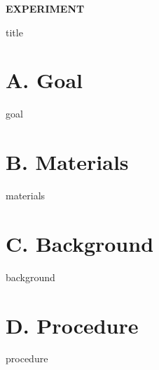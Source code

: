 \documentclass[cover.tex]{subfiles}
\begin{document}
 


\hfill\vspace{0.2cm}\begin{center}{\large \bfseries EXPERIMENT \thechapter\par\Huge
 {title}
 \\[5pt] \par}\vspace{0.2cm}\end{center}\par\noindent

 
 
\section*{A. Goal}
{goal}
\section*{B. Materials}
{materials}
\section*{C. Background}
{background}



\section*{D. Procedure}
{procedure}
\end{document}

